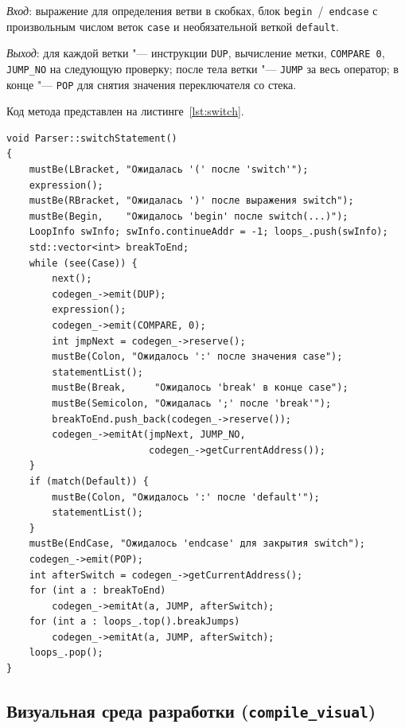 \documentclass[a4paper,final]{article}
\begin{document}
\textit{Вход}: выражение для определения ветви в скобках, блок \texttt{begin}~/~\texttt{endcase}
с произвольным числом веток \texttt{case} и необязательной веткой \texttt{default}.

\textit{Выход}: для каждой ветки "--- инструкции \texttt{DUP}, вычисление
метки, \texttt{COMPARE~0}, \texttt{JUMP\_NO} на следующую проверку; после
тела ветки "--- \texttt{JUMP} за весь оператор; в конце "--- \texttt{POP}
для снятия значения переключателя со стека.

Код метода представлен на листинге~\ref{lst:switch}.

\begin{lstlisting}[caption={Метод Parser::switchStatement}, label=lst:switch]
void Parser::switchStatement()
{
    mustBe(LBracket, "Ожидалась '(' после 'switch'");
    expression();
    mustBe(RBracket, "Ожидалась ')' после выражения switch");
    mustBe(Begin,    "Ожидалось 'begin' после switch(...)");
    LoopInfo swInfo; swInfo.continueAddr = -1; loops_.push(swInfo);
    std::vector<int> breakToEnd;
    while (see(Case)) {
        next();
        codegen_->emit(DUP);
        expression();
        codegen_->emit(COMPARE, 0);
        int jmpNext = codegen_->reserve();
        mustBe(Colon, "Ожидалось ':' после значения case");
        statementList();
        mustBe(Break,     "Ожидалось 'break' в конце case");
        mustBe(Semicolon, "Ожидалась ';' после 'break'");
        breakToEnd.push_back(codegen_->reserve());
        codegen_->emitAt(jmpNext, JUMP_NO,
                         codegen_->getCurrentAddress());
    }
    if (match(Default)) {
        mustBe(Colon, "Ожидалось ':' после 'default'");
        statementList();
    }
    mustBe(EndCase, "Ожидалось 'endcase' для закрытия switch");
    codegen_->emit(POP);
    int afterSwitch = codegen_->getCurrentAddress();
    for (int a : breakToEnd)
        codegen_->emitAt(a, JUMP, afterSwitch);
    for (int a : loops_.top().breakJumps)
        codegen_->emitAt(a, JUMP, afterSwitch);
    loops_.pop();
}
\end{lstlisting}

\subsection{Визуальная среда разработки (\texttt{compile\_visual})}
\end{document}
